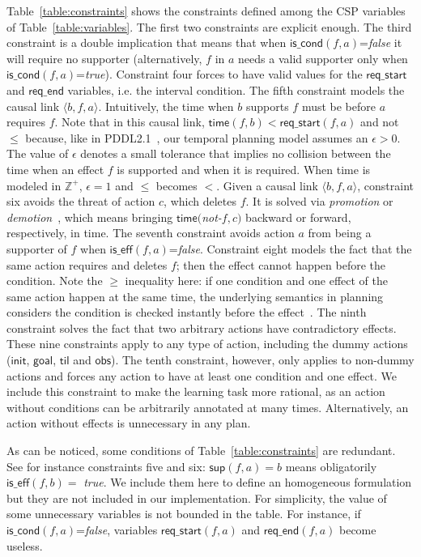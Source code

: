 \documentclass{ecai}
\newcommand{\tup}[1]{{\langle #1 \rangle}}
\newcommand{\iscond}{\mathsf{is\_cond}}    %
\newcommand{\iseff}{\mathsf{is\_eff}}    %
\newcommand{\obs}{\mathsf{obs}}    %
\newcommand{\til}{\mathsf{til}}    %
\newcommand{\supp}{\mathsf{sup}}   %
\newcommand{\tim}{\mathsf{time}}   %
\newcommand{\reqs}{\mathsf{req\_{start}}} %
\newcommand{\reqe}{\mathsf{req\_{end}}}   %
\newcommand{\ini}{\mathsf{init}}   %
\newcommand{\goal}{\mathsf{goal}}  %
\begin{document}
Table~\ref{table:constraints} shows the constraints defined among the CSP variables of Table~\ref{table:variables}. The first two constraints are explicit enough. The third constraint is a double implication that means that when $\iscond(f,a)$=\textit{false} it will require no supporter (alternatively, $f$ in $a$ needs a valid supporter only when $\iscond(f,a)$=\textit{true}). Constraint four forces to have valid values for the $\reqs$ and $\reqe$ variables, i.e. the interval condition.
The fifth constraint models the causal link $\tup{b,f,a}$. Intuitively, the time when $b$ supports $f$ must be before $a$ requires $f$. Note that in this causal link, $\tim(f,b) < \reqs(f,a)$ and not $\leq$ because, like in PDDL2.1~\cite{fox2003pddl2}, our temporal planning model assumes an $\epsilon > 0$. The value of $\epsilon$ denotes a small tolerance that implies no collision between the time when an effect $f$ is supported and when it is required. When time is modeled in 
$\mathbb{Z}^+$, $\epsilon=1$ and $\leq$ becomes $<$.
Given a causal link $\tup{b,f,a}$, constraint six avoids the threat of action $c$, which deletes $f$. It is solved via {\em promotion} or {\em demotion}~\cite{ghallab2004automated}, which means bringing $\tim($\textit{not-}$f,c)$ backward or forward, respectively, in time.
The seventh constraint avoids action $a$ from being a supporter of $f$ when $\iseff(f,a)$=\textit{false}.
Constraint eight models the fact that the same action requires and deletes $f$; then the effect cannot happen before the condition. 
Note the $\geq$ inequality here: if one condition and one effect of the same action happen at the same time, the underlying semantics in planning considers the condition is checked instantly before the effect~\cite{fox2003pddl2}.
The ninth constraint solves the fact that two arbitrary actions have contradictory effects.
These nine constraints apply to any type of action, including the dummy actions ($\ini$, $\goal$, $\til$ and $\obs$).
The tenth constraint, however, only applies to non-dummy actions and forces any action to have at least one condition and one effect.
We include this constraint to make the learning task more rational, as an action without conditions can be arbitrarily annotated at many times. Alternatively, an action without effects is unnecessary in any plan.

As can be noticed, some conditions of Table~\ref{table:constraints} are redundant. See for instance constraints five and six: $\supp(f,a)=b$ means obligatorily $\iseff(f,b)=$ \textit{true}. 
We include them here to define an homogeneous formulation but they are not included in our implementation.
For simplicity, the value of some unnecessary variables is not bounded in the table. For instance, if $\iscond(f,a)$=\textit{false}, variables $\reqs(f,a)$ and $\reqe(f,a)$ become useless.
\end{document}
